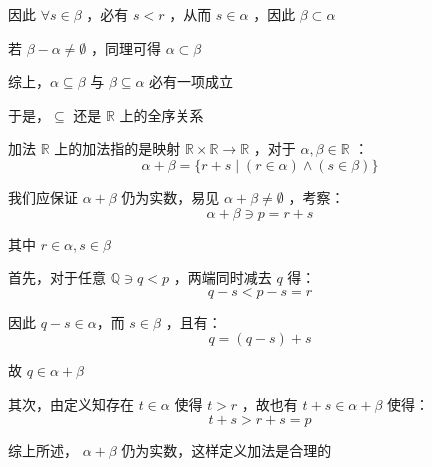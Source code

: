 因此 $\forall s\in\beta$ ，必有 $s<r$ ，从而 $s\in\alpha$ ，因此 $\beta\subset \alpha$

若 $\beta-\alpha\neq\emptyset$ ，同理可得 $\alpha\subset \beta$

综上，$\alpha\subseteq \beta$   与 $\beta\subseteq \alpha$  必有一项成立

于是，$\subseteq$ 还是 $\mathbb{R}$ 上的全序关系



\begin{definition}{加法}
$\mathbb{R}$ 上的加法指的是映射 $\mathbb{R}\times\mathbb{R}\to\mathbb{R}$ ，对于 $\alpha,\beta\in\mathbb{R}$ ：
$$\alpha+\beta=\{r+s\mid(r\in\alpha)\wedge(s\in\beta)\}$$ 
\end{definition}
我们应保证 $\alpha+\beta$ 仍为实数，易见 $\alpha+\beta\neq \emptyset$ ，考察：
$$\alpha+\beta\ni p=r+s$$

其中 $r\in\alpha,s\in\beta$

首先，对于任意 $\mathbb{Q}\ni q<p$ ，两端同时减去 $q$ 得：
$$q-s< p-s=r$$

因此 $q-s\in\alpha$，而 $s\in\beta$ ，且有：
$$q=(q-s)+s$$

故 $q\in\alpha+\beta$

其次，由定义知存在 $t\in\alpha$ 使得 $t>r$ ，故也有 $t+s\in\alpha+\beta$ 使得：
$$t+s>r+s=p$$

综上所述， $\alpha+\beta$ 仍为实数，这样定义加法是合理的

